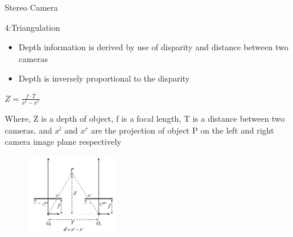 \documentclass[10pt]{beamer}
\begin{document}
\begin{frame}{Stereo Camera}

    \begin{block}{4:Triangulation}
       \begin{itemize}
           \item Depth information is derived by use of disparity and distance between two cameras
           \item Depth is inversely proportional to the disparity
       \end{itemize}
    \centering
    $Z = \frac{f \cdot T}{x^l - x^r}$
       
    Where, Z is a depth of object, f is a focal length, T is a distance between two cameras, and $x^l$ and $x^r$ are the projection of object P on the left and right camera image plane respectively
       
    \begin{figure}
        \centering
        \includegraphics[width=0.35\textwidth]{Images/triangulate.png}
    \end{figure}
   \end{block}
\end{frame}
\end{document}
